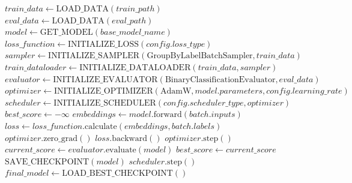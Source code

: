 \begingroup %
\captionsetup{type=algorithm} %
\label{alg:finetune}
\begin{algorithmic}[1]
\scriptsize
\onehalfspacing
{}
    \State {}
    \State $train\_data \gets \text{LOAD\_DATA}(train\_path)$
    \State $eval\_data \gets \text{LOAD\_DATA}(eval\_path)$
    \State
    \State $model \gets \text{GET\_MODEL}(base\_model\_name)$
    \State $loss\_function \gets \text{INITIALIZE\_LOSS}(config.loss\_type)$
    \State
    \State {}
    \State $sampler \gets \text{INITIALIZE\_SAMPLER}(\text{GroupByLabelBatchSampler}, train\_data)$
    \State $train\_dataloader \gets \text{INITIALIZE\_DATALOADER}(train\_data, sampler)$
    \State $evaluator \gets \text{INITIALIZE\_EVALUATOR}(\text{BinaryClassificationEvaluator}, eval\_data)$
    \State
    \State {}
    \State $optimizer \gets \text{INITIALIZE\_OPTIMIZER}(\text{AdamW}, model.parameters, config.learning\_rate)$
    \State $scheduler \gets \text{INITIALIZE\_SCHEDULER}(config.scheduler\_type, optimizer)$
    \State
    \State $best\_score \gets -\infty$
    \State
    \State {}
            \State {}
            \State $embeddings \gets model.\text{forward}(batch.inputs)$
            \State
            \State {}
            \State $loss \gets loss\_function.\text{calculate}(embeddings, batch.labels)$
            \State
            \State {}
            \State $optimizer.\text{zero\_grad}()$
            \State $loss.\text{backward}()$
            \State $optimizer.\text{step}()$
        \EndFor
        \State
        \State {}
        \State $current\_score \gets evaluator.\text{evaluate}(model)$
        \State
        \State {}
            \State $best\_score \gets current\_score$
            \State $\text{SAVE\_CHECKPOINT}(model)$
        \EndIf
        \State
        \State {}
        \State $scheduler.\text{step}()$
    \EndFor
    \State
    \State {}
    \State $final\_model \gets \text{LOAD\_BEST\_CHECKPOINT}()$
    \State {}
\EndProcedure
\end{algorithmic}
\endgroup

